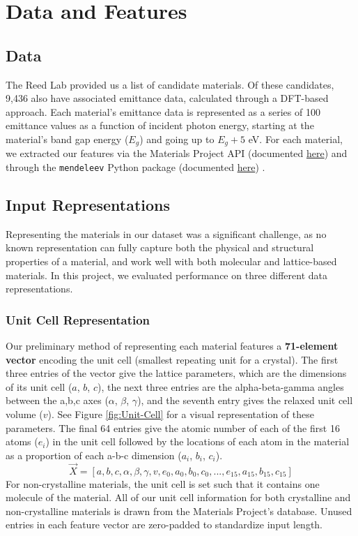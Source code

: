 \documentclass[10pt,twocolumn,letterpaper]{article}
\begin{document}
\section{Data and Features}

\subsection{Data}
The Reed Lab provided us a list of candidate materials. Of these candidates, 9,436 also have associated emittance data, calculated through a DFT-based approach. Each material's emittance data is represented as a series of 100 emittance values as a function of incident photon energy, starting at the material's band gap energy ($E_g$) and going up to $E_g + 5$ eV. For each material, we extracted our features via the Materials Project API (documented \href{https://materialsproject.org/}{here}) and through the \texttt{mendeleev} Python package (documented \href{https://mendeleev.readthedocs.io/en/latest/index.html}{here}) \cite{mendeleev}.

\subsection{Input Representations}

Representing the materials in our dataset was a significant challenge, as no known representation can fully capture both the physical and structural properties of a material, and work well with both molecular and lattice-based materials. In this project, we evaluated performance on three different data representations.

\subsubsection{Unit Cell Representation}
Our preliminary method of representing each material features a \textbf{71-element vector} encoding the unit cell (smallest repeating unit for a crystal). The first three entries of the vector give the lattice parameters, which are the dimensions of its unit cell ($a$, $b$, $c$), the next three entries are the alpha-beta-gamma angles between the a,b,c axes ($\alpha$, $\beta$, $\gamma$), and the seventh entry gives the relaxed unit cell volume ($v$). See Figure \ref{fig:Unit-Cell} for a visual representation of these parameters. The final 64 entries give the atomic number of each of the first 16 atoms ($e_i$) in the unit cell followed by the locations of each atom in the material as a proportion of each a-b-c dimension ($a_i$, $b_i$, $c_i$). 
$$\Vec{X} = [a, b, c, \alpha, \beta, \gamma, v, e_0, a_0, b_0, c_0, ..., e_{15}, a_{15}, b_{15}, c_{15}]$$
For non-crystalline materials, the unit cell is set such that it contains one molecule of the material. All of our unit cell information for both crystalline and non-crystalline materials is drawn from the Materials Project's database. Unused entries in each feature vector are zero-padded to standardize input length. 
\end{document}
